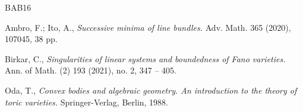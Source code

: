 \documentclass[12pt,twoside]{amsart}
\theoremstyle{plain}
\theoremstyle{definition}
\theoremstyle{remark}
\begin{document}

\begin{thebibliography}{BAB16}


Ambro, F.; Ito, A.,
{\em Successive minima of line bundles.}
{Adv. Math. 365 (2020), 107045, 38 pp.}

Birkar, C.,
{\em Singularities of linear systems and boundedness of Fano varieties.}
{Ann. of Math. (2) 193 (2021), no. 2, 347 -- 405.}
 
Oda, T.,
{\em Convex bodies and algebraic geometry. 
	An introduction to the theory of toric varieties.}
{Springer-Verlag, Berlin, 1988.}

\end{thebibliography}
\end{document}
